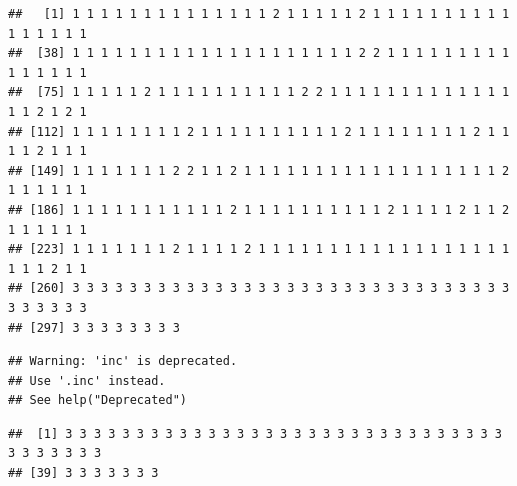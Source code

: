 \documentclass[
]{book}
\newenvironment{Shaded}{\begin{snugshade}}{\end{snugshade}}
\newcommand{\CommentTok}[1]{\textcolor[rgb]{0.56,0.35,0.01}{\textit{#1}}}
\newcommand{\DecValTok}[1]{\textcolor[rgb]{0.00,0.00,0.81}{#1}}
\newcommand{\FunctionTok}[1]{\textcolor[rgb]{0.00,0.00,0.00}{#1}}
\newcommand{\NormalTok}[1]{#1}
\newcommand{\SpecialCharTok}[1]{\textcolor[rgb]{0.00,0.00,0.00}{#1}}
\newcommand{\StringTok}[1]{\textcolor[rgb]{0.31,0.60,0.02}{#1}}
\begin{document}
\begin{Shaded}
\end{Shaded}

\begin{verbatim}
##   [1] 1 1 1 1 1 1 1 1 1 1 1 1 1 1 2 1 1 1 1 1 2 1 1 1 1 1 1 1 1 1 1 1 1 1 1 1 1
##  [38] 1 1 1 1 1 1 1 1 1 1 1 1 1 1 1 1 1 1 1 1 2 2 1 1 1 1 1 1 1 1 1 1 1 1 1 1 1
##  [75] 1 1 1 1 1 2 1 1 1 1 1 1 1 1 1 1 2 2 1 1 1 1 1 1 1 1 1 1 1 1 1 1 1 2 1 2 1
## [112] 1 1 1 1 1 1 1 1 2 1 1 1 1 1 1 1 1 1 1 2 1 1 1 1 1 1 1 1 2 1 1 1 1 2 1 1 1
## [149] 1 1 1 1 1 1 1 2 2 1 1 2 1 1 1 1 1 1 1 1 1 1 1 1 1 1 1 1 1 1 2 1 1 1 1 1 1
## [186] 1 1 1 1 1 1 1 1 1 1 1 2 1 1 1 1 1 1 1 1 1 1 2 1 1 1 1 2 1 1 2 1 1 1 1 1 1
## [223] 1 1 1 1 1 1 1 2 1 1 1 1 2 1 1 1 1 1 1 1 1 1 1 1 1 1 1 1 1 1 1 1 1 1 2 1 1
## [260] 3 3 3 3 3 3 3 3 3 3 3 3 3 3 3 3 3 3 3 3 3 3 3 3 3 3 3 3 3 3 3 3 3 3 3 3 3
## [297] 3 3 3 3 3 3 3 3
\end{verbatim}

\begin{Shaded}
\end{Shaded}

\begin{verbatim}
## Warning: 'inc' is deprecated.
## Use '.inc' instead.
## See help("Deprecated")
\end{verbatim}

\begin{verbatim}
##  [1] 3 3 3 3 3 3 3 3 3 3 3 3 3 3 3 3 3 3 3 3 3 3 3 3 3 3 3 3 3 3 3 3 3 3 3 3 3 3
## [39] 3 3 3 3 3 3 3
\end{verbatim}
\end{document}
